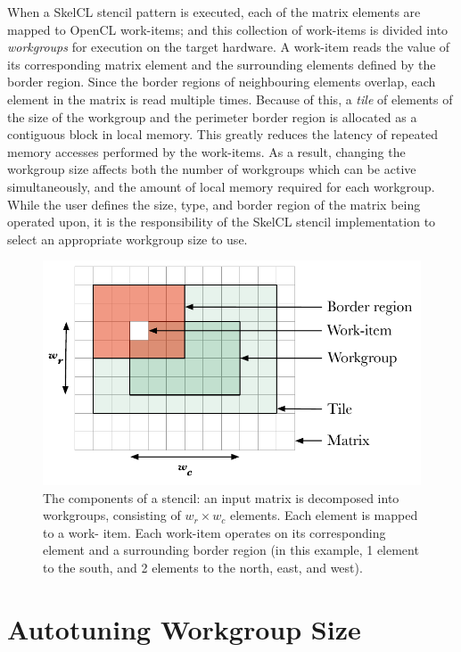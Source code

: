 \documentclass[preprint,nonatbib,10pt,nocopyrightspace]{sigplanconf}
\begin{document}
  When a SkelCL stencil pattern is executed, each of the matrix elements are
  mapped to OpenCL work-items; and this collection of work-items is divided into
  \emph{workgroups} for execution on the target hardware. A work-item reads the
  value of its corresponding matrix element and the surrounding elements defined
  by the border region. Since the border regions of neighbouring elements overlap,
  each element in the matrix is read multiple times. Because of this, a
  \emph{tile} of elements of the size of the workgroup and the perimeter border
  region is allocated as a contiguous block in local memory. This greatly reduces
  the latency of repeated memory accesses performed by the work-items. As a
  result, changing the workgroup size affects both the number of workgroups which
  can be active simultaneously, and the amount of local memory required for each
  workgroup. While the user defines the size, type, and border region of the
  matrix being operated upon, it is the responsibility of the SkelCL stencil
  implementation to select an appropriate workgroup size to use.

  \begin{figure}
    \centering
    \includegraphics[width=.75\columnwidth]{img/stencil}
    \caption[Stencil border region]{%
    The components of a stencil: an input matrix is decomposed into workgroups,
    consisting of $w_r \times w_c$ elements. Each element is mapped to a work-
    item. Each work-item operates on its corresponding element and a surrounding
    border region (in this example, 1 element to the south, and 2 elements to the
    north, east, and west).
    \vspace{-1em}
    }
    \label{fig:stencil-shape}
  \end{figure}


  \section{Autotuning Workgroup Size}
\end{document}
